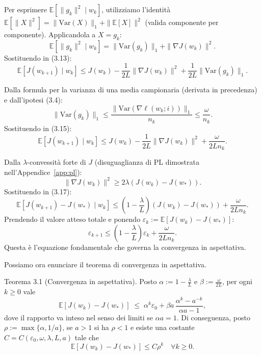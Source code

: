\documentclass[a4paper,12pt]{article}
\begin{document}
Per esprimere \(\mathbb{E}[\|g_k\|^2 \mid w_k]\), utilizziamo l'identità \(\mathbb{E}[\|X\|^2] = \|\mathrm{Var}(X)\|_1 + \|\mathbb{E}[X]\|^2\) (valida componente per componente). Applicandola a \(X = g_k\):
\[
\mathbb{E}[\|g_k\|^2 \mid w_k] = \|\mathrm{Var}(g_k)\|_1 + \|\nabla J(w_k)\|^2. \tag{3.14}
\]
Sostituendo in (3.13):
\[
\mathbb{E}[J(w_{k+1}) \mid w_k] \le J(w_k) - \frac{1}{2L}\|\nabla J(w_k)\|^2 + \frac{1}{2L}\|\mathrm{Var}(g_k)\|_1. \tag{3.15}
\]

Dalla formula per la varianza di una media campionaria (derivata in precedenza) e dall'ipotesi (3.4):
\[
\|\mathrm{Var}(g_k)\|_1 \le \frac{\|\mathrm{Var}(\nabla \ell(w_k;i))\|_1}{n_k} \le \frac{\omega}{n_k}. \tag{3.16}
\]
Sostituendo in (3.15):
\[
\mathbb{E}[J(w_{k+1}) \mid w_k] \le J(w_k) - \frac{1}{2L}\|\nabla J(w_k)\|^2 + \frac{\omega}{2L n_k}. \tag{3.17}
\]

Dalla \(\lambda\)-convessità forte di \(J\) (disuguaglianza di PL dimostrata nell'Appendice~\ref{app:pl}):
\[
\|\nabla J(w_k)\|^2 \ge 2\lambda (J(w_k) - J(w_*)). \tag{3.18}
\]
Sostituendo in (3.17):
\[
\mathbb{E}[J(w_{k+1}) - J(w_*) \mid w_k] \le \left(1 - \frac{\lambda}{L}\right)(J(w_k) - J(w_*)) + \frac{\omega}{2L n_k}. \tag{3.19}
\]
Prendendo il valore atteso totale e ponendo \(\varepsilon_k := \mathbb{E}[J(w_k) - J(w_*)]\):
\[
\varepsilon_{k+1} \le \left(1 - \frac{\lambda}{L}\right)\varepsilon_k + \frac{\omega}{2L n_k}. \tag{3.20}
\]
Questa è l'equazione fondamentale che governa la convergenza in aspettativa.

Possiamo ora enunciare il teorema di convergenza in aspettativa.

\begin{thmbox}
Teorema 3.1 (Convergenza in aspettativa).
Posto $\alpha := 1-\frac{\lambda}{L}$ e $\beta := \frac{\omega}{2L}$, per ogni $k\ge 0$ vale
\[
\mathbb{E}[J(w_k)-J(w_*)] \;\le\; \alpha^k\varepsilon_0
+ \beta a\,\frac{\alpha^k-a^{-k}}{\alpha a-1},
\tag{3.21}
\]
dove il rapporto va inteso nel senso dei limiti se $\alpha a=1$.
Di conseguenza, posto $\rho:=\max\{\alpha,1/a\}$, se $a>1$ si ha $\rho<1$ e
esiste una costante $C=C(\varepsilon_0,\omega,\lambda,L,a)$ tale che
\[
\mathbb{E}[J(w_k)-J(w_*)]\le C\rho^k\quad\forall k\ge0.
\]
\end{thmbox}
\end{document}
